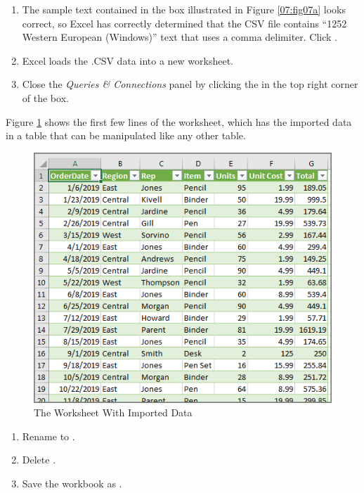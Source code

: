 \begin{enumbox}
\begin{enumerate}
		\item The sample text contained in the box illustrated in Figure \ref{07:fig07a} looks correct, so Excel has correctly determined that the CSV file contains ``1252 Western European (Windows)'' text that uses a comma delimiter. Click .
		\item Excel loads the .CSV data into a new worksheet.
		\item Close the \textit{Queries \& Connections} panel by clicking the  in the top right corner of the box.
	\end{enumerate}
\end{enumbox}

Figure \ref{07:fig10} shows the first few lines of the worksheet, which has the imported data in a table that can be manipulated like any other table.

\begin{figure}[H]
	\centering
	\includegraphics[width=\maxwidth{.95\linewidth}]{gfx/ch07_fig10}
	\caption{The Worksheet With Imported Data}
	\label{07:fig10}
\end{figure}

\begin{enumbox}
	\begin{enumerate}
		\item Rename  to .
		\item Delete .
		\item Save the workbook as .
	\end{enumerate}
\end{enumbox}
	
